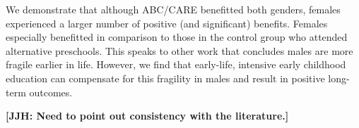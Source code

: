 We demonstrate that although ABC/CARE benefitted both genders, females experienced a larger number of positive (and significant) benefits. Females especially benefitted in comparison to those in the control group who attended alternative preschools. This speaks to other work that concludes males are more fragile earlier in life. However, we find that early-life, intensive early childhood education can compensate for this fragility in males and result in positive long-term outcomes. 

\textbf{[JJH: Need to point out consistency with the literature.]}